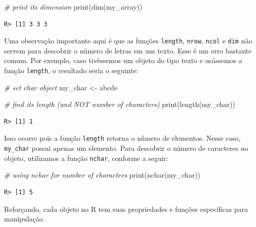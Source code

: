 \documentclass[
  11pt,
]{book}
\newenvironment{Shaded}{\begin{snugshade}}{\end{snugshade}}
\newcommand{\CommentTok}[1]{\textcolor[rgb]{0.37,0.37,0.37}{\textit{#1}}}
\newcommand{\FunctionTok}[1]{\textcolor[rgb]{0,0,0}{#1}}
\newcommand{\NormalTok}[1]{#1}
\newcommand{\OtherTok}[1]{\textcolor[rgb]{0.37,0.37,0.37}{#1}}
\newcommand{\StringTok}[1]{\textcolor[rgb]{0.5,0.5,0.5}{#1}}
\begin{document}
\begin{Shaded}
\begin{Highlighting}[]
\CommentTok{\# print its dimension}
\FunctionTok{print}\NormalTok{(}\FunctionTok{dim}\NormalTok{(my\_array))}
\end{Highlighting}
\end{Shaded}

\begin{verbatim}
R> [1] 3 3 3
\end{verbatim}

Uma observação importante aqui é que as funções \texttt{length}, \texttt{nrow}, \texttt{ncol} e \texttt{dim} não servem para descobrir o número de letras em um texto. Esse é um erro bastante comum. Por exemplo, caso tivéssemos um objeto do tipo texto e usássemos a função \texttt{length}, o resultado seria o seguinte:

\begin{Shaded}
\begin{Highlighting}[]
\CommentTok{\# set char object}
\NormalTok{my\_char }\OtherTok{\textless{}{-}} \StringTok{\textquotesingle{}abcde\textquotesingle{}}

\CommentTok{\# find its length (and NOT number of characters)}
\FunctionTok{print}\NormalTok{(}\FunctionTok{length}\NormalTok{(my\_char))}
\end{Highlighting}
\end{Shaded}

\begin{verbatim}
R> [1] 1
\end{verbatim}

Isso ocorre pois a função \texttt{length} retorna o número de elementos. Nesse caso, \texttt{my\_char} possui apenas um elemento. Para descobrir o número de caracteres no objeto, utilizamos a função \texttt{nchar}, conforme a seguir:

\begin{Shaded}
\begin{Highlighting}[]
\CommentTok{\# using nchar for number of characters}
\FunctionTok{print}\NormalTok{(}\FunctionTok{nchar}\NormalTok{(my\_char))}
\end{Highlighting}
\end{Shaded}

\begin{verbatim}
R> [1] 5
\end{verbatim}

Reforçando, cada objeto no R tem suas propriedades e funções específicas para manipulação.
\end{document}
